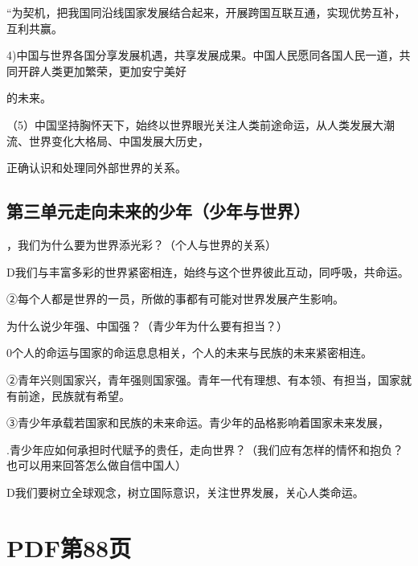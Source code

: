 \documentclass[lang=cn,11pt]{elegantbook}
\newcommand{\daofasym}[1]{{\daofasymbolfont #1}}
\newcommand{\daofasym}[1]{#1}
\begin{document}
“为契机，把我国同沿线国家发展结合起来，开展跨国互联互通，实现优势互补，互利共赢。\par

4)中国与世界各国分享发展机遇，共享发展成果。中国人民愿同各国人民一道，共同开辟人类更加繁荣，更加安宁美好\par

的未来。\par

（5）中国坚持胸怀天下，始终以世界眼光关注人类前途命运，从人类发展大潮流、世界变化大格局、中国发展大历史，\par

正确认识和处理同外部世界的关系。\par

\subsection*{第三单元走向未来的少年（少年与世界）}

，我们为什么要为世界添光彩？（个人与世界的关系）\par

D我们与丰富多彩的世界紧密相连，始终与这个世界彼此互动，同呼吸，共命运。\par

\daofasym{②}每个人都是世界的一员，所做的事都有可能对世界发展产生影响。\par

为什么说少年强、中国强？（青少年为什么要有担当？）\par

0个人的命运与国家的命运息息相关，个人的未来与民族的未来紧密相连。\par

\daofasym{②}青年兴则国家兴，青年强则国家强。青年一代有理想、有本领、有担当，国家就有前途，民族就有希望。\par

\daofasym{③}青少年承载若国家和民族的未来命运。青少年的品格影响着国家未来发展，\par

.青少年应如何承担时代赋予的贵任，走向世界？（我们应有怎样的情怀和抱负？也可以用来回答怎么做自信中国人）\par

D我们要树立全球观念，树立国际意识，关注世界发展，关心人类命运。\par


\section*{PDF第88页}
\end{document}
